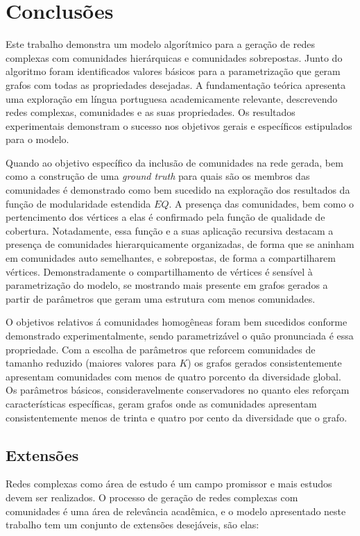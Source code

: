 \documentclass[notes.tex]{subfiles}
\begin{document}
\chapter{Conclusões}

Este trabalho demonstra um modelo algorítmico para a geração de redes complexas com comunidades hierárquicas e comunidades sobrepostas.
Junto do algoritmo foram identificados valores básicos para a parametrização que geram grafos com todas as propriedades desejadas.
A fundamentação teórica apresenta uma exploração em língua portuguesa academicamente relevante, descrevendo redes complexas, comunidades e as suas propriedades.
Os resultados experimentais demonstram o sucesso nos objetivos gerais e específicos estipulados para o modelo.

Quando ao objetivo específico da inclusão de comunidades na rede gerada, bem como a construção de uma \emph{ground truth} para quais são os membros das comunidades é demonstrado como bem sucedido na exploração dos resultados da função de modularidade estendida $EQ$.
A presença das comunidades, bem como o pertencimento dos vértices a elas é confirmado pela função de qualidade de cobertura.
Notadamente, essa função e a suas aplicação recursiva destacam a presença de comunidades hierarquicamente organizadas, de forma que se aninham em comunidades auto semelhantes, e sobrepostas, de forma a compartilharem vértices.
Demonstradamente o compartilhamento de vértices é sensível à parametrização do modelo, se mostrando mais presente em grafos gerados a partir de parâmetros que geram uma estrutura com menos comunidades.

O objetivos relativos á comunidades homogêneas foram bem sucedidos conforme demonstrado experimentalmente, sendo parametrizável o quão pronunciada é essa propriedade.
Com a escolha de parâmetros que reforcem comunidades de tamanho reduzido (maiores valores para $K$) os grafos gerados consistentemente apresentam comunidades com menos de quatro porcento da diversidade global.
Os parâmetros básicos, consideravelmente conservadores no quanto eles reforçam características específicas, geram grafos onde as comunidades apresentam consistentemente menos de trinta e quatro por cento da diversidade que o grafo.

\section{Extensões}

Redes complexas como área de estudo é um campo promissor e mais estudos devem ser realizados.
O processo de geração de redes complexas com comunidades é uma área de relevância acadêmica, e o modelo apresentado neste trabalho tem um conjunto de extensões desejáveis, são elas:
\end{document}
